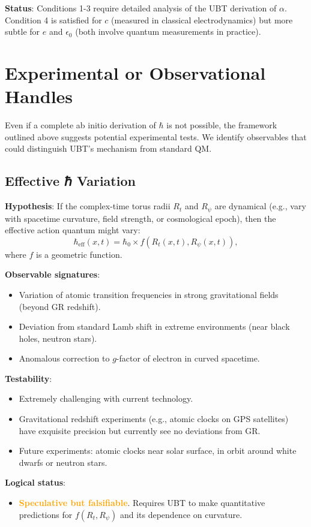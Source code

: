 \documentclass[12pt]{article}
\begin{document}
\textbf{Status}: Conditions 1-3 require detailed analysis of the UBT derivation of $\alpha$. Condition 4 is satisfied for $c$ (measured in classical electrodynamics) but more subtle for $e$ and $\epsilon_0$ (both involve quantum measurements in practice).

\section{Experimental or Observational Handles}

Even if a complete ab initio derivation of $\hbar$ is not possible, the framework outlined above suggests potential experimental tests. We identify observables that could distinguish UBT's mechanism from standard QM.

\subsection{Effective ℏ Variation}

\textbf{Hypothesis}: If the complex-time torus radii $R_t$ and $R_\psi$ are dynamical (e.g., vary with spacetime curvature, field strength, or cosmological epoch), then the effective action quantum might vary:
\[
\hbar_{\text{eff}}(x, t) = \hbar_0 \times f(R_t(x,t), R_\psi(x,t)),
\]
where $f$ is a geometric function.

\textbf{Observable signatures}:
\begin{itemize}
\item Variation of atomic transition frequencies in strong gravitational fields (beyond GR redshift).
\item Deviation from standard Lamb shift in extreme environments (near black holes, neutron stars).
\item Anomalous correction to $g$-factor of electron in curved spacetime.
\end{itemize}

\textbf{Testability}:
\begin{itemize}
\item Extremely challenging with current technology.
\item Gravitational redshift experiments (e.g., atomic clocks on GPS satellites) have exquisite precision but currently see no deviations from GR.
\item Future experiments: atomic clocks near solar surface, in orbit around white dwarfs or neutron stars.
\end{itemize}

\textbf{Logical status}:
\begin{itemize}
\item \textcolor{orange}{\textbf{Speculative but falsifiable}}. Requires UBT to make quantitative predictions for $f(R_t, R_\psi)$ and its dependence on curvature.
\end{itemize}
\end{document}
